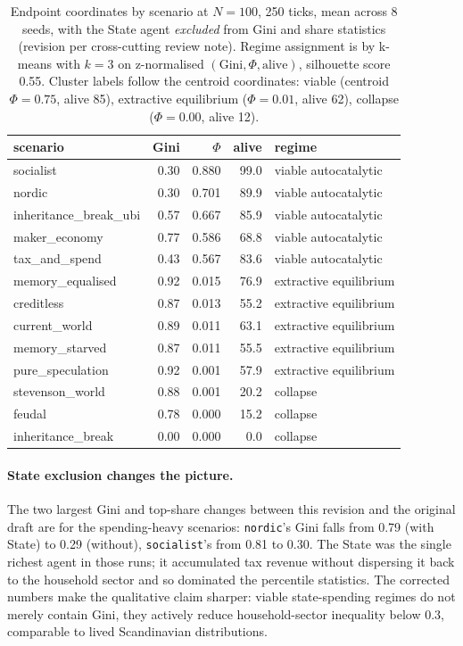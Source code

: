 \documentclass[11pt]{article}
\begin{document}
\begin{table}[t]
\centering
\small
\caption{Endpoint coordinates by scenario at $N=100$, 250 ticks, mean
across 8 seeds, with the State agent \emph{excluded} from Gini and
share statistics (revision per cross-cutting review note). Regime
assignment is by k-means with $k=3$ on z-normalised
$(\text{Gini}, \Phi, \text{alive})$, silhouette score 0.55. Cluster
labels follow the centroid coordinates: viable (centroid $\Phi=0.75$,
alive 85), extractive equilibrium ($\Phi=0.01$, alive 62), collapse
($\Phi=0.00$, alive 12).}
\label{tab:regimes}
\begin{tabular}{lrrrl}
\toprule
scenario & Gini & $\Phi$ & alive & regime \\
\midrule
socialist             & 0.30 & 0.880 & 99.0 & viable autocatalytic \\
nordic                & 0.30 & 0.701 & 89.9 & viable autocatalytic \\
inheritance\_break\_ubi & 0.57 & 0.667 & 85.9 & viable autocatalytic \\
maker\_economy        & 0.77 & 0.586 & 68.8 & viable autocatalytic \\
tax\_and\_spend       & 0.43 & 0.567 & 83.6 & viable autocatalytic \\
memory\_equalised     & 0.92 & 0.015 & 76.9 & extractive equilibrium \\
creditless            & 0.87 & 0.013 & 55.2 & extractive equilibrium \\
current\_world        & 0.89 & 0.011 & 63.1 & extractive equilibrium \\
memory\_starved       & 0.87 & 0.011 & 55.5 & extractive equilibrium \\
pure\_speculation     & 0.92 & 0.001 & 57.9 & extractive equilibrium \\
stevenson\_world      & 0.88 & 0.001 & 20.2 & collapse \\
feudal                & 0.78 & 0.000 & 15.2 & collapse \\
inheritance\_break    & 0.00 & 0.000 &  0.0 & collapse \\
\bottomrule
\end{tabular}
\end{table}

\paragraph{State exclusion changes the picture.} The two largest
Gini and top-share changes between this revision and the original
draft are for the spending-heavy scenarios: \texttt{nordic}'s Gini
falls from 0.79 (with State) to 0.29 (without), \texttt{socialist}'s
from 0.81 to 0.30. The State was the single richest agent in those
runs; it accumulated tax revenue without dispersing it back to the
household sector and so dominated the percentile statistics. The
corrected numbers make the qualitative claim sharper: viable
state-spending regimes do not merely contain Gini, they actively
reduce household-sector inequality below 0.3, comparable to lived
Scandinavian distributions.
\end{document}

